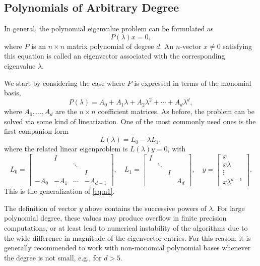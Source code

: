 \subsection{\label{sec:pep1}Polynomials of Arbitrary Degree}

In general, the polynomial eigenvalue problem can be formulated as
\begin{equation}
\label{eq:pep}
P(\lambda)x=0,
\end{equation}
where $P$ is an $n\times n$ matrix polynomial of degree $d$. An $n$-vector $x\neq 0$ satisfying this equation is called an eigenvector associated with the corresponding eigenvalue $\lambda$.

We start by considering the case where $P$ is expressed in terms of the monomial basis,
\begin{equation}
\label{eq:pepmon}
P(\lambda)=A_0+A_1 \lambda+A_2\lambda^2 +  \dotsb + A_d \lambda^d,
\end{equation}
where $A_0,\ldots,A_d$ are the $n\times n$ coefficient matrices. As before, the problem can be solved via some kind of linearization. One of the most commonly used ones is the first companion form
\begin{equation}
\label{eq:firstcomp}
L(\lambda)=L_0 -\lambda L_1,
\end{equation}
where the related linear eigenproblem is $L(\lambda)y=0$, with
\begin{equation}
\label{eq:firstcompfull}
L_0 =
\begin{bmatrix}
  & I \\
  & & \ddots \\
  & & & I \\
  -A_0 & -A_1 & \cdots  & -A_{d-1}
\end{bmatrix},\quad
L_1 =
\begin{bmatrix}
  I \\
  & \ddots \\
  & & I \\
  & & & A_d
\end{bmatrix}, \quad
y=
\begin{bmatrix}
  x \\ x\lambda\\ \vdots \\ x\lambda^{d-1}
\end{bmatrix}.
\end{equation}
This is the generalization of \eqref{eq:n1}.

The definition of vector $y$ above contains the successive powers of $\lambda$. For large polynomial degree, these values may produce overflow in finite precision computations, or at least lead to numerical instability of the algorithms due to the wide difference in magnitude of the eigenvector entries. For this reason, it is generally recommended to work with non-monomial polynomial bases whenever the degree is not small, e.g., for $d>5$.

